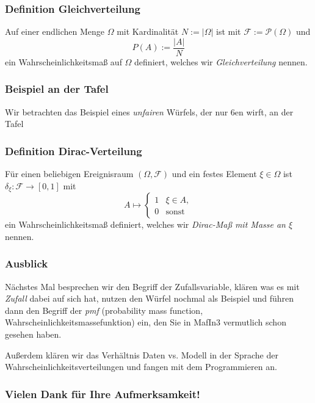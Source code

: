\begin{frame}\frametitle{Definition Gleichverteilung}
  Auf einer endlichen Menge $\Omega$ mit Kardinalität $N := |\Omega|$ ist mit $\mathcal{F} := \mathcal{P}(\Omega)$ und
  \[P(A) := \dfrac{|A|}{N}\]
  ein Wahrscheinlichkeitsmaß auf $\Omega$ definiert, welches wir \emph{Gleichverteilung} nennen.
\end{frame}

\begin{frame}\frametitle{Beispiel an der Tafel}
  Wir betrachten das Beispiel eines \emph{unfairen} Würfels, der nur $6$en wirft, an der Tafel
\end{frame}


\begin{frame}\frametitle{Definition Dirac-Verteilung}
  Für einen beliebigen Ereignisraum $(\Omega, \mathcal{F})$ und ein festes Element $\xi \in \Omega$
  ist
  $\delta_\xi \colon \mathcal{F} \to [0,1]$ mit
  \[A \mapsto \begin{cases} 1 & \xi \in A, \\ 0 & \text{sonst} \end{cases}\]
ein Wahrscheinlichkeitsmaß definiert, welches wir \emph{Dirac-Maß mit Masse an $\xi$} nennen.
\end{frame}

\begin{frame}\frametitle{Ausblick}
  Nächstes Mal besprechen wir den Begriff der Zufallsvariable, klären was es mit \emph{Zufall} dabei auf sich hat, nutzen den Würfel nochmal als Beispiel und führen dann den Begriff der \emph{pmf} (probability mass function, Wahrscheinlichkeitsmassefunktion) ein, den Sie in MafIn3 vermutlich schon gesehen haben.

  Außerdem klären wir das Verhältnis Daten vs. Modell in der Sprache der Wahrscheinlichkeitsverteilungen und fangen mit dem Programmieren an.
\end{frame}

\begin{frame}[separator]
  \frametitle{Vielen Dank für Ihre Aufmerksamkeit!}
\end{frame}



